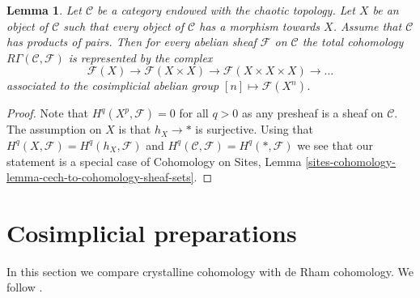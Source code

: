\documentclass{stacks-project}
\theoremstyle{plain}
\newtheorem{lemma}[subsection]{Lemma}
\theoremstyle{definition}
\theoremstyle{remark}
\numberwithin{equation}{subsection}
\begin{document}
\begin{lemma}
\label{lemma-category-with-covering}
Let $\mathcal{C}$ be a category endowed with the chaotic topology.
Let $X$ be an object of $\mathcal{C}$ such that every object of
$\mathcal{C}$ has a morphism towards $X$. Assume that $\mathcal{C}$
has products of pairs.
Then for every abelian sheaf $\mathcal{F}$ on $\mathcal{C}$
the total cohomology $R\Gamma(\mathcal{C}, \mathcal{F})$ is represented
by the complex
$$
\mathcal{F}(X) \to \mathcal{F}(X \times X) \to
\mathcal{F}(X \times X \times X) \to \ldots
$$
associated to the cosimplicial abelian group $[n] \mapsto \mathcal{F}(X^n)$.
\end{lemma}

\begin{proof}
Note that $H^q(X^p, \mathcal{F}) = 0$ for all $q > 0$ as any presheaf is a
sheaf on $\mathcal{C}$. The assumption on $X$ is that $h_X \to *$
is surjective. Using that $H^q(X, \mathcal{F}) = H^q(h_X, \mathcal{F})$ and
$H^q(\mathcal{C}, \mathcal{F}) = H^q(*, \mathcal{F})$ we see that our
statement is a special case of
Cohomology on Sites,
Lemma \ref{sites-cohomology-lemma-cech-to-cohomology-sheaf-sets}.
\end{proof}









\section{Cosimplicial preparations}
\label{section-cohomology}

\noindent
In this section we compare crystalline cohomology with de Rham
cohomology. We follow \cite{Bhatt}.
\end{document}
